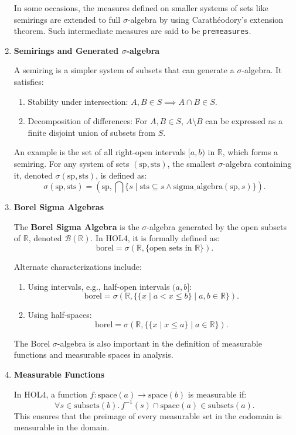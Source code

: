 \begin{enumerate}
In some occasions, the measures defined on smaller systems of sets like semirings are extended to full \(\sigma\)-algebra by using Carathéodory's extension theorem. Such intermediate measures are said to be \texttt{premeasures}.

\item \textbf{Semirings and Generated \(\sigma\)-algebra}

A semiring is a simpler system of subsets that can generate a \(\sigma\)-algebra. It satisfies:
\begin{enumerate}
    \item Stability under intersection: \( A, B \in S \implies A \cap B \in S \).
    \item Decomposition of differences: For \(A, B \in S\), \(A \setminus B\) can be expressed as a finite disjoint union of subsets from \(S\).
\end{enumerate}

An example is the set of all right-open intervals \([a, b)\) in \(\mathbb{R}\), which forms a semiring. For any system of sets \((\text{sp}, \text{sts})\), the smallest \(\sigma\)-algebra containing it, denoted \(\sigma(\text{sp}, \text{sts})\), is defined as:
\[
\sigma(\text{sp}, \text{sts}) = (\text{sp}, \bigcap \{s \mid \text{sts} \subseteq s \land \text{sigma\_algebra}(\text{sp}, s)\}).
\]

\item \textbf{Borel Sigma Algebras}

The \textbf{Borel Sigma Algebra} is the \(\sigma\)-algebra generated by the open subsets of \(\mathbb{R}\), denoted \(\mathcal{B}(\mathbb{R})\). In HOL4, it is formally defined as:
\[
\text{borel} = \sigma(\mathbb{R}, \{\text{open sets in } \mathbb{R}\}).
\]

Alternate characterizations include:

\begin{enumerate}
    \item Using intervals, e.g., half-open intervals \((a, b]\):
   \[
   \text{borel} = \sigma(\mathbb{R}, \{\{x \mid a < x \leq b\} \mid a, b \in \mathbb{R}\}).
   \]

    \item Using half-spaces:
   \[
   \text{borel} = \sigma(\mathbb{R}, \{\{x \mid x \leq a\} \mid a \in \mathbb{R}\}).
   \]

\end{enumerate}
The Borel \(\sigma\)-algebra is also important in the definition of measurable functions and measurable spaces in analysis.

    \item \textbf{Measurable Functions}

In HOL4, a function \(f : \text{space}(a) \to \text{space}(b)\) is measurable if:
\[
\forall s \in \text{subsets}(b).\, f^{-1}(s) \cap \text{space}(a) \in \text{subsets}(a).
\]
This ensures that the preimage of every measurable set in the codomain is measurable in the domain.

\end{enumerate}

